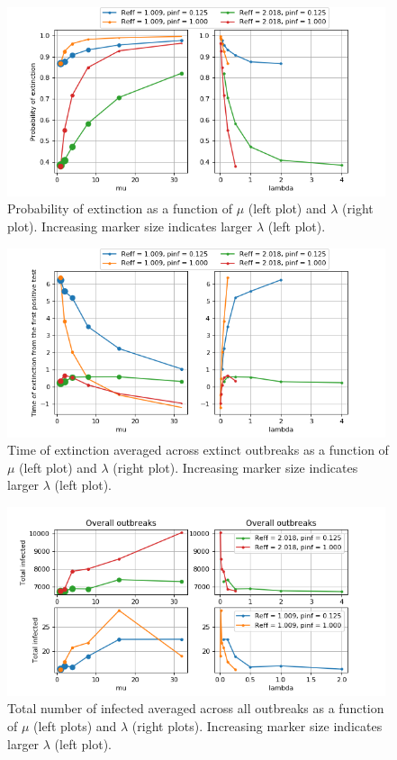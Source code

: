 \documentclass[sr]{drdc-report}
\begin{document}
\begin{figure}
  \includegraphics[width=0.99\textwidth, keepaspectratio=true]{figures/pext_exp1}
  \caption{Probability of extinction as a function of $\mu$ (left plot) and $\lambda$ (right plot). Increasing marker size indicates larger $\lambda$ (left plot).}\label{fig_plt_pextExp1}
\end{figure}

\begin{figure}
  \includegraphics[width=0.99\textwidth, keepaspectratio=true]{figures/text_exp1}
  \caption{Time of extinction averaged across extinct outbreaks as a function of $\mu$ (left plot) and $\lambda$ (right plot). Increasing marker size indicates larger $\lambda$ (left plot).}\label{fig_plt_textExp1}
\end{figure}

\begin{figure}
  \includegraphics[width=0.99\textwidth, keepaspectratio=true]{figures/Ninf_exp1}
  \caption{Total number of infected averaged across all outbreaks as a function of $\mu$ (left plots) and $\lambda$ (right plots). Increasing marker size indicates larger $\lambda$  (left plot).}\label{fig_plt_NinfExp1}
\end{figure}
\end{document}

